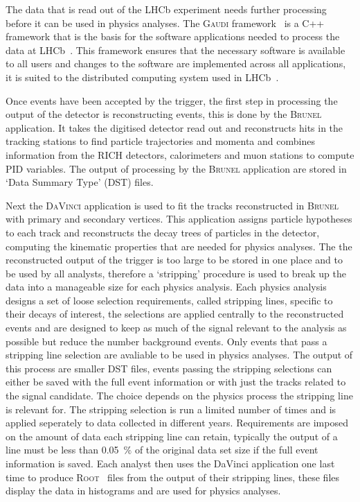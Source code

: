 The data that is read out of the LHCb experiment needs further processing before it can be used in physics analyses. The \textsc{Gaudi} framework~\cite{Mato:1998gfa} is a C++ framework that is the basis for the software applications needed to process the data at LHCb~\cite{Antunes-Nobrega:835156}. This framework ensures that the necessary software is available to all users and changes to the software are implemented across all applications, it is suited to the distributed computing system used in LHCb~\cite{Stagni:2012rs}. 


Once events have been accepted by the trigger, the first step in processing the output of the detector is reconstructing events, this is done by the \textsc{Brunel} application. It takes the digitised detector read out and reconstructs hits in the tracking stations to find particle trajectories and momenta and combines information from the RICH detectors, calorimeters and muon stations to compute PID variables. The output of processing by the \textsc{Brunel} application are stored in `Data Summary Type' (DST) files. 

Next the \textsc{DaVinci} application is used to fit the tracks reconstructed in \textsc{Brunel} with primary and secondary vertices. This application assigns particle hypotheses to each track and reconstructs the decay trees of particles in the detector, computing the kinematic properties that are needed for physics analyses. The the reconstructed output of the trigger is too large to be stored in one place and to be used by all analysts, therefore a `stripping' procedure is used to break up the data into a manageable size for  each physics analysis. Each physics analysis designs a set of loose selection requirements, called stripping lines, specific to their decays of interest, the selections are applied centrally to the reconstructed events and are designed to keep as much of the signal relevant to the analysis as possible but reduce the number background events. Only events that pass a stripping line selection are avaliable to be used in physics analyses. The output of this process are smaller DST files, events passing the stripping selections can either be saved with the full event information or with just the tracks related to the signal candidate. The choice depends on the physics process the stripping line is relevant for. The stripping selection is run a limited number of times and is applied seperately to data collected in different years. Requirements are imposed on the amount of data each stripping line can retain, typically the output of a line must be less than 0.05~$\%$ of the original data set size if the full event information is saved. Each analyst then uses the DaVinci application one last time to produce \textsc{Root}~\cite{Brun:1997pa} files from the output of their stripping lines, these files display the data in histograms and are used for physics analyses. %


